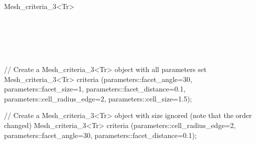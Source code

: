 \begin{ccRefClass}{Mesh_criteria_3<Tr>}
\ccSeeAlso

 \\
 \\
\\
 \\


\ccExample

\begin{ccExampleCode}
// Create a Mesh_criteria_3<Tr> object with all parameters set
Mesh_criteria_3<Tr> criteria (parameters::facet_angle=30,
                              parameters::facet_size=1,
                              parameters::facet_distance=0.1,
                              parameters::cell_radius_edge=2,
                              parameters::cell_size=1.5);

// Create a Mesh_criteria_3<Tr> object with size ignored (note that the order changed)
Mesh_criteria_3<Tr> criteria (parameters::cell_radius_edge=2,
                              parameters::facet_angle=30,
                              parameters::facet_distance=0.1);
\end{ccExampleCode}



\end{ccRefClass}

\ccRefPageEnd

